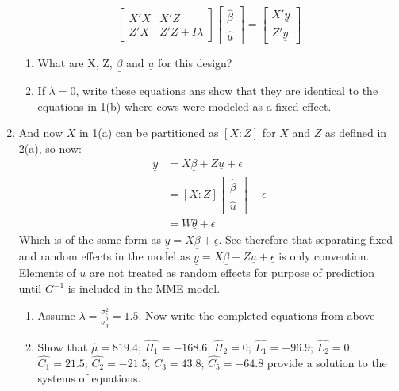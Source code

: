 \documentclass[12pt,a4paper]{paper}
\begin{document}
\begin{enumerate}
\[\left[\begin{array}{cc} X'X & X'Z\\Z'X & Z'Z + I\lambda\end{array}\right]\left[\begin{array}{c}\underline{\hat{\beta}}\\\underline{\hat{u}}\end{array}\right] = \left[\begin{array}{c}X'\underline{y}\\Z'\underline{y}\end{array}\right]\]
\begin{enumerate}
\item What are X, Z, $\underline{\beta}$ and $\underline{u}$ for this design?
\item If $\lambda = 0$, write these equations ans show that they are identical to the equations in 1(b) where cows were modeled as a fixed effect.
\end{enumerate}
\item And now $X$ in 1(a) can be partitioned as $\left[X : Z\right]$ for $X$ and $Z$ as defined in 2(a), so now:
\begin{align*}
\underline{y} &= X\underline{\beta} + Z\underline{u} + \epsilon\\
&= \left[X:Z\right]\left[\begin{array}{c}\underline{\hat{\beta}}\\\underline{\hat{u}}\end{array}\right] + \epsilon \\
&= W\underline{\theta} + \epsilon
\end{align*}
Which is of the same form as $\underline{y} = X\underline{\beta} + \underline{\epsilon}$. See therefore that separating fixed and random effects in the model as $\underline{y} = X\underline{\beta} + Z\underline{u} + \underline{\epsilon}$ is only convention. Elements of $\underline{u}$ are not treated as random effects for purpose of prediction until $G^{-1}$ is included in the MME model. 
\begin{enumerate}
\item Assume $\lambda = \frac{\sigma^{2}_{\epsilon}}{\sigma^{2}_{g}} = 1.5$. Now write the completed equations from above
\item Show that $\hat{\mu} = 819.4$; $\hat{H_{1}} = -168.6$; $\hat{H_{2}} = 0$; $\hat{L_{1}} = -96.9$; $\hat{L_{2}} = 0$; $\hat{C_{1}} = 21.5$; $\hat{C_{2}} = -21.5$; $\hat{C_{3}} = 43.8$; $\hat{C_{5}} = -64.8$ provide a solution to the systems of equations.

\end{enumerate}
\end{enumerate}
\end{document}
